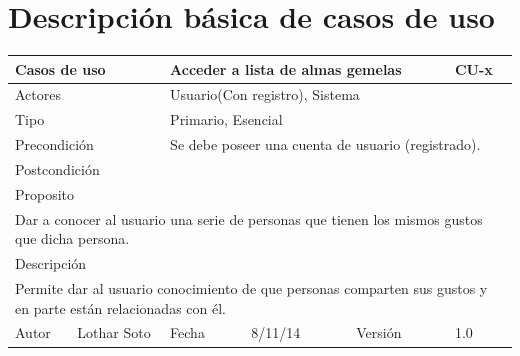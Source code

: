 \documentclass{article}
\begin{document}
\section{Descripción básica de casos de uso}

\begin{table}[h]
\begin{tabular}{|l|l|l|l|l|l|}
\hline
\multicolumn{2}{|p{2cm}|}{Casos de uso}  & \multicolumn{3}{p{7cm}|}{\textbf{Acceder a lista de almas gemelas}} & CU-x \\
\hline
\multicolumn{2}{|p{2cm}|}{Actores}       & \multicolumn{4}{p{8cm}|}{Usuario(Con registro), Sistema}        \\
\hline
\multicolumn{2}{|p{2cm}|}{Tipo}          & \multicolumn{4}{p{8cm}|}{Primario, Esencial}        \\
\hline
\multicolumn{2}{|p{2cm}|}{Precondición}  & \multicolumn{4}{p{8cm}|}{Se debe poseer una cuenta de usuario (registrado).}        \\
\hline
\multicolumn{2}{|p{2cm}|}{Postcondición} & \multicolumn{4}{p{8cm}|}{}        \\
\hline
\multicolumn{6}{|p{10cm}|}{Proposito}                                   \\
\hline
\multicolumn{6}{|p{10cm}|}{Dar a conocer al usuario una serie de personas que tienen los mismos gustos que dicha persona.}                                            \\
\hline
\multicolumn{6}{|p{10cm}|}{Descripción}                                 \\
\hline
\multicolumn{6}{|p{10cm}|}{Permite dar al usuario conocimiento de que personas comparten sus gustos y en parte están relacionadas con él.}                                            \\
\hline
Autor          &       Lothar Soto        & Fecha    &  8/11/14   &   Versión  & 1.0\\    
\hline
\end{tabular}
\end{table}

\clearpage
\end{document}
